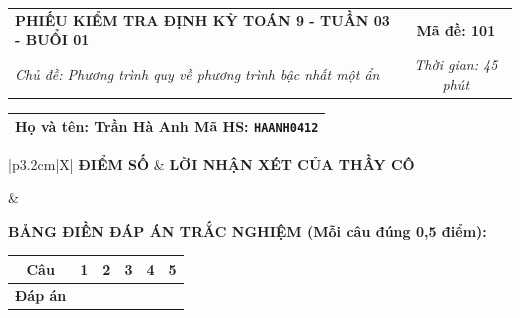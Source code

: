\documentclass[12pt,a4paper]{article}
\begin{document}
\pagestyle{empty}



\noindent
\begin{tabularx}{\linewidth}{|X|c|}
\hline
\textbf{PHIẾU KIỂM TRA ĐỊNH KỲ TOÁN 9 - TUẦN 03 - BUỔI 01} & \textbf{Mã đề: 101} \\
\textit{Chủ đề: Phương trình quy về phương trình bậc nhất một ẩn} & \textit{Thời gian: 45 phút} \\
\hline
\end{tabularx}

\vspace{1mm}

\noindent
\begin{tabularx}{\linewidth}{|X|}
\hline
\rule[-2mm]{0pt}{7.5mm}\textbf{Họ và tên:} \textbf{\large Trần Hà Anh} \hfill \textbf{Mã HS:} \texttt{HAANH0412} \quad \\
\hline
\end{tabularx}

\vspace{1mm}

\noindent
\begin{tabularx}{\linewidth}{|p{3.2cm}|X|}
\hline
\centering\textbf{ĐIỂM SỐ} & \centering\textbf{LỜI NHẬN XÉT CỦA THẦY CÔ} \tabularnewline
\hline
\rule{0pt}{1.3cm} & \tabularnewline
\hline
\end{tabularx}

\vspace{1.2mm}

\noindent\textbf{BẢNG ĐIỀN ĐÁP ÁN TRẮC NGHIỆM (Mỗi câu đúng 0,5 điểm):}
\vspace{0.8mm}

\noindent
\renewcommand{\arraystretch}{1.35}
\begin{tabularx}{\linewidth}{|c|*{5}{>{\centering\arraybackslash}X|}}
\hline
\textbf{Câu} & \textbf{1} & \textbf{2} & \textbf{3} & \textbf{4} & \textbf{5} \\
\hline
\textbf{Đáp án} & & & & & \\
\hline
\end{tabularx}
\renewcommand{\arraystretch}{1.0}

\vspace{1.5mm}
\end{document}
